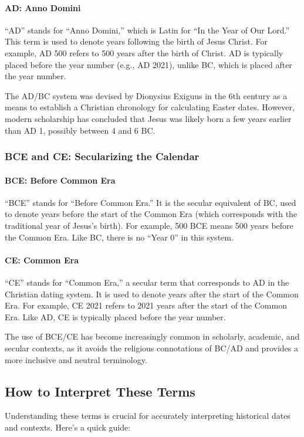\documentclass[a4paper,12pt]{book}
\begin{document}
\paragraph{AD: Anno Domini}
``AD'' stands for ``Anno Domini,'' which is Latin for ``In the Year of Our Lord.'' This term is used to denote years following the birth of Jesus Christ. For example, AD 500 refers to 500 years after the birth of Christ. AD is typically placed before the year number (e.g., AD 2021), unlike BC, which is placed after the year number.

The AD/BC system was devised by Dionysius Exiguus in the 6th century as a means to establish a Christian chronology for calculating Easter dates. However, modern scholarship has concluded that Jesus was likely born a few years earlier than AD 1, possibly between 4 and 6 BC.

\subsubsection*{BCE and CE: Secularizing the Calendar}
\paragraph{BCE: Before Common Era}
``BCE'' stands for ``Before Common Era.'' It is the secular equivalent of BC, used to denote years before the start of the Common Era (which corresponds with the traditional year of Jesus’s birth). For example, 500 BCE means 500 years before the Common Era. Like BC, there is no ``Year 0'' in this system.

\paragraph{CE: Common Era}
``CE'' stands for ``Common Era,'' a secular term that corresponds to AD in the Christian dating system. It is used to denote years after the start of the Common Era. For example, CE 2021 refers to 2021 years after the start of the Common Era. Like AD, CE is typically placed before the year number.

The use of BCE/CE has become increasingly common in scholarly, academic, and secular contexts, as it avoids the religious connotations of BC/AD and provides a more inclusive and neutral terminology.

\subsection*{How to Interpret These Terms}
Understanding these terms is crucial for accurately interpreting historical dates and contexts. Here’s a quick guide:
\end{document}

